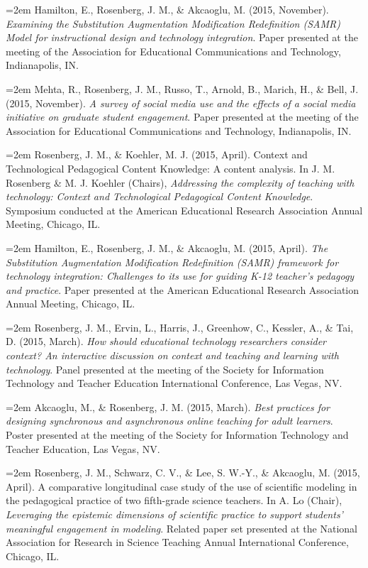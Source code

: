 \documentclass[14,]{article}
\begin{document}
\hangindent=2em Hamilton, E., Rosenberg, J. M., \& Akcaoglu, M. (2015,
November). \emph{Examining the Substitution Augmentation Modification
Redefinition (SAMR) Model for instructional design and technology
integration}. Paper presented at the meeting of the Association for
Educational Communications and Technology, Indianapolis, IN.

\hangindent=2em Mehta, R., Rosenberg, J. M., Russo, T., Arnold, B.,
Marich, H., \& Bell, J. (2015, November). \emph{A survey of social media
use and the effects of a social media initiative on graduate student
engagement}. Paper presented at the meeting of the Association for
Educational Communications and Technology, Indianapolis, IN.

\hangindent=2em Rosenberg, J. M., \& Koehler, M. J. (2015, April).
Context and Technological Pedagogical Content Knowledge: A content
analysis. In J. M. Rosenberg \& M. J. Koehler (Chairs), \emph{Addressing
the complexity of teaching with technology: Context and Technological
Pedagogical Content Knowledge}. Symposium conducted at the American
Educational Research Association Annual Meeting, Chicago, IL.

\hangindent=2em Hamilton, E., Rosenberg, J. M., \& Akcaoglu, M. (2015,
April). \emph{The Substitution Augmentation Modification Redefinition
(SAMR) framework for technology integration: Challenges to its use for
guiding K-12 teacher's pedagogy and practice}. Paper presented at the
American Educational Research Association Annual Meeting, Chicago, IL.

\hangindent=2em Rosenberg, J. M., Ervin, L., Harris, J., Greenhow, C.,
Kessler, A., \& Tai, D. (2015, March). \emph{How should educational
technology researchers consider context? An interactive discussion on
context and teaching and learning with technology}. Panel presented at
the meeting of the Society for Information Technology and Teacher
Education International Conference, Las Vegas, NV.

\hangindent=2em Akcaoglu, M., \& Rosenberg, J. M. (2015, March).
\emph{Best practices for designing synchronous and asynchronous online
teaching for adult learners}. Poster presented at the meeting of the
Society for Information Technology and Teacher Education, Las Vegas, NV.

\hangindent=2em Rosenberg, J. M., Schwarz, C. V., \& Lee, S. W.-Y., \&
Akcaoglu, M. (2015, April). A comparative longitudinal case study of the
use of scientific modeling in the pedagogical practice of two
fifth-grade science teachers. In A. Lo (Chair), \emph{Leveraging the
epistemic dimensions of scientific practice to support students'
meaningful engagement in modeling}. Related paper set presented at the
National Association for Research in Science Teaching Annual
International Conference, Chicago, IL.
\end{document}
